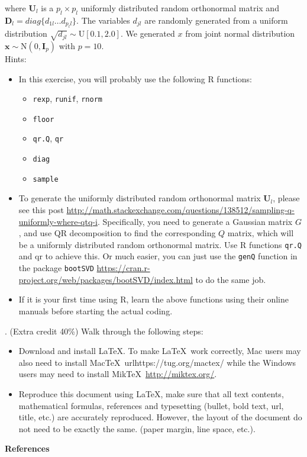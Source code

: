 \documentclass{article}
\begin{document}
\noindent where $\mathbf{U}_l$ is a $p_l \times p_l$ uniformly distributed random orthonormal
matrix and $\mathbf{D}_l = diag \{d_{1l} \dots d_{p_l l}\}$. The variables $d_{jl}$ are randomly generated from
a uniform distribution $\sqrt{d_{jl}} \sim \text{U}[0.1, 2.0]$. We generated $x$ from joint normal
distribution $\mathbf{x} \sim \text{N}(0, \mathbf{I}_p)$ with $p = 10$.\\

\noindent Hints:
\begin{itemize} 

\item In this exercise, you will
probably use the following R functions:

\begin{itemize} 
\item \texttt{rexp}, \texttt{runif}, \texttt{rnorm}
\item \texttt{floor}
\item \texttt{qr.Q}, \texttt{qr}
\item \texttt{diag}
\item \texttt{sample}
\end{itemize} 
 
\item To generate the uniformly distributed random orthonormal matrix $\mathbf{U}_l$, please see
this post
\url{http://math.stackexchange.com/questions/138512/sampling-q-uniformly-where-qtq-i}.
Specifically, you need to generate a Gaussian matrix $G$, and use QR decomposition
to find the corresponding $Q$ matrix, which will be a uniformly distributed random
orthonormal matrix. Use R functions \texttt{qr.Q} and qr to achieve this. Or much easier,
you can just use the \texttt{genQ} function in the package \texttt{bootSVD}
\url{https://cran.r-project.org/web/packages/bootSVD/index.html} to do the same
job.
\item If it is your first time using R, learn the above functions using their
online manuals before starting the actual coding.
\end{itemize} 



. (Extra credit 40\%) Walk
through the following steps:

\begin{itemize}
\item Download and install \LaTeX. To make \LaTeX\ work
correctly, Mac users may also need to install Mac\TeX\ url{https://tug.org/mactex/}
while the Windows users may need to install Mik\TeX\ \url{http://miktex.org/}.

\item Reproduce this document using \LaTeX, make sure that all text contents,
mathematical formulas, references and typesetting (bullet, bold text, url,
title, etc.) are accurately reproduced. However, the layout of the document do
not need to be exactly the same. (paper margin, line space, etc.).
\end{itemize}

\centering
\textbf{References}
\vspace{-1cm}
 
 
\end{document}
